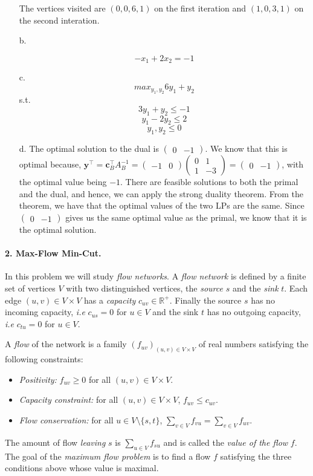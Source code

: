 \documentclass[11pt]{article}
\theoremstyle{remark}
\newcommand{\R}{\mathbb{R}}                     %
\newcommand{\by}{\mathbf{y}}
\newcommand{\bc}{\mathbf{c}}
\begin{document}
\begin{itemize}
The vertices visited are $(0,0,6,1)$ on the first iteration and $(1,0,3,1)$ on the second interation.

     \item[b.]
     
     $$-x_1+2x_2=-1$$
     \item[c.] 
     $$max_{y_1,y_2} 6y_1+y_2$$
     s.t.
     $$3y_1+y_2\leq -1$$
     $$y_1-2y_2 \leq 2$$
     $$y_1,y_2\leq 0$$
     \item[d.] 
     The optimal solution to the dual is $\begin{pmatrix}
0 & -1
\end{pmatrix}$. We know that this is optimal because, $\by^\intercal=\bc^\intercal_B A_B^{-1}=\begin{pmatrix}
-1 & 0
\end{pmatrix} \begin{pmatrix}
0 & 1 \\
1 & -3 
\end{pmatrix} = \begin{pmatrix}
0 & -1
\end{pmatrix} $, with the optimal value being $-1$. There are feasible solutions to both the primal and the dual, and hence, we can apply the strong duality theorem. From the theorem, we have that the optimal values of the two LPs are the same. Since $\begin{pmatrix}
0 & -1
\end{pmatrix}$ gives us the same optimal value as the primal, we know that it is the optimal solution.
\end{itemize}
\color{black}


\paragraph{2. Max-Flow Min-Cut.}
In this problem we will study \emph{flow networks}. A \emph{flow network} is
defined by a finite set of vertices $V$ with two distinguished vertices, the
\emph{source} $s$ and the \emph{sink} $t$. Each edge $(u,v)\in
V\times V$ has a \emph{capacity} $c_{uv}\in\R^+$. Finally the source $s$ has no
incoming capacity, \emph{i.e} $c_{us} = 0$ for $u\in V$ and the sink $t$ has no
outgoing capacity, \emph{i.e} $c_{tu} = 0$ for $u\in V$.

A \emph{flow} of the network is a family $(f_{uv})_{(u,v)\in V\times V}$ of
real numbers satisfying the following constraints:
\begin{itemize}
    \item \emph{Positivity:} $f_{uv}\geq 0$ for all $(u,v)\in V\times V$.
    \item \emph{Capacity constraint:} for all $(u,v)\in V\times V$, $f_{uv}\leq c_{uv}$.
    \item \emph{Flow conservation:} for all $u\in V\setminus\{s,t\}$,
    $\sum_{v\in V}f_{vu} = \sum_{v\in V} f_{uv}$.
\end{itemize}
The amount of flow \emph{leaving} $s$ is $\sum_{u\in V} f_{su}$ and is called
the \emph{value of the flow} $f$. The goal of the \emph{maximum flow problem}
is to find a flow $f$ satisfying the three conditions above whose value is
maximal.
\end{document}
